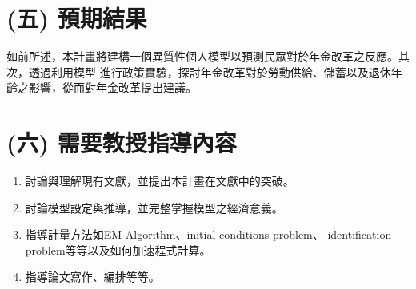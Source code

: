 \documentclass[12pt]{article}
\begin{document}
\begin{CJK*}{UTF8}{bkai}
\section*{\normalfont(五) 預期結果}
如前所述，本計畫將建構一個異質性個人模型以預測民眾對於年金改革之反應。其次，透過利用模型
進行政策實驗，探討年金改革對於勞動供給、儲蓄以及退休年齡之影響，從而對年金改革提出建議。
\section*{\normalfont(六) 需要教授指導內容}
\begin{enumerate}
    \item 討論與理解現有文獻，並提出本計畫在文獻中的突破。
    \item 討論模型設定與推導，並完整掌握模型之經濟意義。
    \item 指導計量方法如EM Algorithm、initial conditions problem、
    identification problem等等以及如何加速程式計算。
    \item 指導論文寫作、編排等等。
\end{enumerate}



\end{CJK*}
\end{document}
